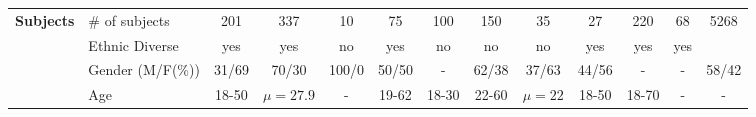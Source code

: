 \begin{sidewaystable}
{\begin{tabular}{l p{3cm} ccccccccccc}
\multirow{4}{*}{\textbf{Subjects}} & \# of subjects                          & 201   & 337      & 10    & 75    & 100      & 150     & 35     & 27    & 220   & 68   & 5268  \\
                          & Ethnic Diverse                          & yes   & yes      & no    & yes   & no       & no      & no     & yes   & yes   & yes  &       \\
                          & Gender \footnotesize{(M/F(\%))}               & 31/69 & 70/30    & 100/0 & 50/50 & -        & 62/38   & 37/63  & 44/56 & -     & -    & 58/42 \\
                          & Age                                     & 18-50 & $\mu=27.9$ & -     & 19-62 & 18-30    & 22-60   & $\mu=22$ & 18-50 & 18-70 & -    & -     
\end{tabular}}
\end{sidewaystable}




